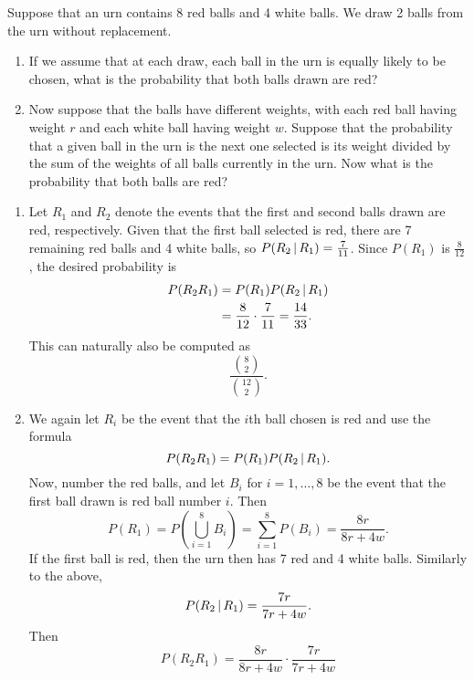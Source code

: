 \begin{changebar}
    \begin{example}
        Suppose that an urn contains 8 red balls and 4 white balls. We draw 2 balls from the urn without replacement. \begin{enumerate}[label=(\alph*)]
            \item If we assume that at each draw, each ball in the urn is equally likely to be chosen, what is the probability that both balls drawn are red?
            \item Now suppose that the balls have different weights, with each red ball having weight $r$ and each white ball having weight $w$. Suppose that the probability that a given ball in the urn is the next one selected is its weight divided by the sum of the weights of all balls currently in the urn. Now what is the probability that both balls are red?
        \end{enumerate}
    \end{example}
    \begin{solution}\hfill
        \begin{enumerate}[label=(\alph*)]
            \item Let $R_1$ and $R_2$ denote the events that the first and second balls drawn are red, respectively. Given that the first ball selected is red, there are 7 remaining red balls and 4 white balls, so $P(R_2 \,\vert\, R_1) = \frac{7}{11}$. Since $P(R_1)$ is $\frac{8}{12}$, the desired probability is \[
                \begin{aligned}
                    P(R_2R_1) &= P(R_1)P(R_2\,\vert\, R_1) \\
                    &= \frac{8}{12}\cdot\frac{7}{11} = \frac{14}{33}.
                \end{aligned}    
            \] This can naturally also be computed as \[
                \frac{\binom{8}{2}}{\binom{12}{2}}.    
            \]
            \item We again let $R_i$ be the event that the $i$th ball chosen is red and use the formula \[
                P(R_2R_1) = P(R_1)P(R_2\,\vert\, R_1).    
            \] Now, number the red balls, and let $B_i$ for $i = 1, \dots, 8$ be the event that the first ball drawn is red ball number $i$. Then \[
                P(R_1) = P\left( \bigcup^8_{i=1} B_i \right) = \sum^8_{i=1} P(B_i) = \frac{8r}{8r+4w}.    
            \] If the first ball is red, then the urn then has 7 red and 4 white balls. Similarly to the above, \[
                P(R_2 \,\vert\, R_1) = \frac{7r}{7r+4w}.
            \] Then \[
                P(R_2R_1) = \frac{8r}{8r+4w}\cdot\frac{7r}{7r+4w}    
            \]
        \end{enumerate}
    \end{solution}
\end{changebar}

